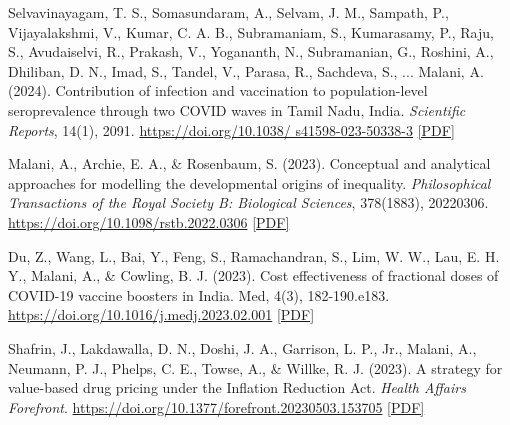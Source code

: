 \begin{tablist}
        \item[2024] \tab{}Selvavinayagam, T. S., Somasundaram, A., Selvam, J. M., Sampath, P., Vijayalakshmi, V., Kumar, C. A. B., Subramaniam, S., Kumarasamy, P., Raju, S., Avudaiselvi, R., Prakash, V., Yogananth, N., Subramanian, G., Roshini, A., Dhiliban, D. N., Imad, S., Tandel, V., Parasa, R., Sachdeva, S., ... Malani, A. (2024). Contribution of infection and vaccination to population-level seroprevalence through two COVID waves in Tamil Nadu, India. \textit{Scientific Reports}, 14(1), 2091. \href{https://doi.org/10.1038/s41598-023-50338-3}{https://doi.org/10.1038/ s41598-023-50338-3} \href{https://github.com/anup-malani/website_personal/blob/main/publications/2024_SelvavinayagamMalaniEtAl_SciReports_TamilNaduSero.pdf}{[PDF]}
        
        \item[2023] \tab{}Malani, A., Archie, E. A., \& Rosenbaum, S. (2023). Conceptual and analytical approaches for modelling the developmental origins of inequality. \textit{Philosophical Transactions of the Royal Society B: Biological Sciences}, 378(1883), 20220306. \href{https://doi.org/10.1098/rstb.2022.0306}{https://doi.org/10.1098/rstb.2022.0306} \href{https://github.com/anup-malani/website_personal/blob/main/publications/2023_MalaniEtAl_PhilTrans_DevtOrigins.pdf}{[PDF]}
        
        \item[2023] \tab{}Du, Z., Wang, L., Bai, Y., Feng, S., Ramachandran, S., Lim, W. W., Lau, E. H. Y., Malani, A., \& Cowling, B. J. (2023). Cost effectiveness of fractional doses of COVID-19 vaccine boosters in India. Med, 4(3), 182-190.e183. \href{https://doi.org/10.1016/j.medj.2023.02.001}{https://doi.org/10.1016/j.medj.2023.02.001} \href{https://github.com/anup-malani/website_personal/blob/main/publications/2023_DuMalaniEtAl_Med_CoestEffectiveFractionalDoses.pdf}{[PDF]} 

        \item[2023] \tab{}Shafrin, J., Lakdawalla, D. N., Doshi, J. A., Garrison, L. P., Jr., Malani, A., Neumann, P. J., Phelps, C. E., Towse, A., \& Willke, R. J. (2023). A strategy for value-based drug pricing under the Inflation Reduction Act. \textit{Health Affairs Forefront}. \href{https://doi.org/10.1377/forefront.20230503.153705}{https://doi.org/10.1377/forefront.20230503.153705} \href{https://github.com/anup-malani/website_personal/blob/main/publications/2023_ShafrinMalaniEtAl_HealthAffairs_IRAValuePricing.pdf}{[PDF]}


\end{tablist}
